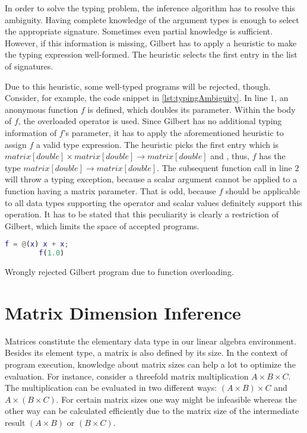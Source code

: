 In order to solve the typing problem, the inference algorithm has to resolve this ambiguity.
Having complete knowledge of the argument types is enough to select the appropriate signature.
Sometimes even partial knowledge is sufficient.
However, if this information is missing, Gilbert has to apply a heuristic to make the typing expression well-formed.
The heuristic selects the first entry in the list of signatures.

Due to this heuristic, some well-typed programs will be rejected, though.
Consider, for example, the code snippet in \cref{lst:typingAmbiguity}.
In line $1$, an anonymous function $f$ is defined, which doubles its parameter.
Within the body of $f$, the overloaded \code{+} operator is used.
Since Gilbert has no additional typing information of $f$'s parameter, it has to apply the aforementioned heuristic to assign $f$ a valid type expression.
The heuristic picks the first entry which is $matrix[double] \times matrix[double] \rightarrow matrix[double]$ and , thus, $f$ has the type $matrix[double] \rightarrow matrix[double]$.
The subsequent function call  in line $2$ will throw a typing exception, because a scalar argument cannot be applied to a function having a matrix parameter.
That is odd, because $f$ should be applicable to all data types supporting the \code{+} operator and scalar values definitely support this operation.
It has to be stated that this peculiarity is clearly a restriction of Gilbert, which limits the space of accepted programs.

\begin{listing}[!h]
	\begin{CenteredBox}
		\begin{lstlisting}[language=Matlab]
		f = @(x) x + x;
		f(1.0)
		\end{lstlisting}
	\end{CenteredBox}
	\caption{Wrongly rejected Gilbert program due to function overloading.}
	\label{lst:typingAmbiguity}
\end{listing}

\section{Matrix Dimension Inference}
\label{sec:MatrixDimensionInference}

Matrices constitute the elementary data type in our linear algebra environment.
Besides its element type, a matrix is also defined by its size.
In the context of program execution, knowledge about matrix sizes can help a lot to optimize the evaluation.
For instance, consider a threefold matrix multiplication $A\times B\times C$.
The multiplication can be evaluated in two different ways: $(A\times B)\times C$ and $A\times(B\times C)$.
For certain matrix sizes one way might be infeasible whereas the other way can be calculated efficiently due to the matrix size of the intermediate result $(A\times B)$ or $(B\times C)$.

